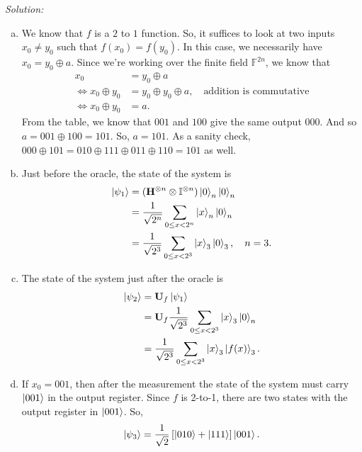 \documentclass{book}
\theoremstyle{definition}
\newcommand{\nn}{\nonumber}
\newcommand{\f}[2]{\frac{#1}{#2}}
\newcommand{\lb}{\left[}
\newcommand{\rb}{\right]}
\newcommand{\U}{\mathbf{U}}
\newcommand{\Id}{\mathbb{I}}
\newcommand{\had}{\mathbf{H}}
\begin{document}
\noindent \textit{Solution:}

\begin{enumerate}[(a)]
	\item We know that $f$ is a $2$ to $1$ function. So, it suffices to look at two inputs $x_0\neq y_0$ such that $f(x_0) = f(y_0)$.  In this case, we necessarily have $x_0 = y_0 \oplus a$. Since we're working over the finite field $\mathbb{F}^{2n}$, we know that
	\begin{align}
	x_0 &= y_0 \oplus a \nn\\
	\iff x_0\oplus y_0 &= y_0 \oplus y_0 \oplus a, \quad \text{addition is commutative}\nn\\
	\iff x_0 \oplus y_0 &= a.
	\end{align}
	From the table, we know that $001$ and $100$ give the same output $000$. And so $a = 001 \oplus 100 = 101$. So, $\boxed{a= 101}$. As a sanity check, $000\oplus 101 = 010 \oplus 111 \oplus 011 \oplus 110 = 101$ as well. 
	
	
	
	\item Just before the oracle, the state of the system is 
	\begin{align}
	\ket{\psi_1} &= (\had^{\otimes n}\otimes \Id^{\otimes n}) \ket{0}_n \ket{0}_n\nn\\
	&= \f{1}{\sqrt{2^n}} \sum_{0 \leq x < 2^n} \ket{x}_n \ket{0}_n\nn\\
	&= \f{1}{\sqrt{2^3}} \sum_{0 \leq x < 2^3} \ket{x}_3 \ket{0}_3, \quad n=3.
	\end{align}
	
	
	
	
	
	
	\item The state of the system just after the oracle is 
	\begin{align}
	\ket{\psi_2} &= \U_f \ket{\psi_1}\nn\\
	&= \U_f \f{1}{\sqrt{2^3}} \sum_{0 \leq x < 2^3} \ket{x}_3 \ket{0}_n\nn\\
	&= \f{1}{\sqrt{2^3}} \sum_{0 \leq x < 2^3} \ket{x}_3 \ket{f(x)}_3.
	\end{align}
	
	
	
	\item If $x_0 = 001$, then after the measurement the state of the system must carry $\ket{001}$ in the output register. Since $f$ is 2-to-1, there are two states with the output register in $\ket{001}$. So, 
	\begin{align}
	\ket{\psi_3} = \f{1}{\sqrt{2}} \lb \ket{010} + \ket{111} \rb \ket{001}.
	\end{align}
	

\end{enumerate}
\end{document}
